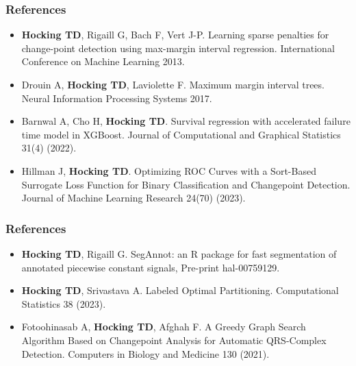 \documentclass{beamer}
\begin{document}
\begin{frame}
  \frametitle{References}
  \scriptsize
  \begin{itemize}
  \item \textbf{Hocking TD}, Rigaill G, Bach F, Vert J-P. Learning
    sparse penalties for change-point detection using max-margin
    interval regression. International Conference on Machine Learning
    2013.
  \item Drouin A, \textbf{Hocking TD}, Laviolette F. Maximum margin interval
    trees. Neural Information Processing Systems 2017.
  \item Barnwal A, Cho H, \textbf{Hocking TD}. Survival regression with
    accelerated failure time model in XGBoost. Journal of Computational and Graphical Statistics 31(4) (2022).
  \item Hillman J, \textbf{Hocking TD}. Optimizing ROC Curves with a
    Sort-Based Surrogate Loss Function for Binary Classification and
    Changepoint Detection. Journal of Machine Learning Research 24(70)
    (2023).
  \end{itemize}
\end{frame}

\begin{frame}
  \frametitle{References}
  \scriptsize
  \begin{itemize}
  \item \textbf{Hocking TD}, Rigaill G. SegAnnot: an R package for
    fast segmentation of annotated piecewise constant signals,
    Pre-print hal-00759129.
  \item \textbf{Hocking TD}, Srivastava A. Labeled Optimal
    Partitioning. Computational Statistics 38 (2023).
  \item Fotoohinasab A, \textbf{Hocking TD}, Afghah F. A Greedy Graph
    Search Algorithm Based on Changepoint Analysis for Automatic
    QRS-Complex Detection. Computers in Biology and Medicine 130
    (2021).
  \end{itemize}
\end{frame}
\end{document}
